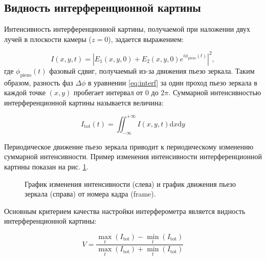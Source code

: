 \subsection{Видность интерференционной картины}\label{sec:ch2/sec1/subsec3}

Интенсивность интерференционной картины, получаемой при наложении двух лучей в плоскости камеры ($z=0$), задается выражением:

\begin{equation}
    I(x,y,t)=|E_1(x,y,0)+E_2(x,y,0)e^{i\phi_{\mathrm{piezo}}(t)}|^2,
\label{eq:I_def}
\end{equation}
где $\phi_{\mathrm{piezo}}(t)$ фазовый сдвиг, получаемый из-за движения пьезо зеркала. Таким образом, разность фаз $\Delta \phi$ в уравнении \eqref{eq:interf} за один проход пьезо зеркала в каждой точке $(x, y)$ пробегает интервал от $0$ до $2\pi$. Суммарной интенсивностью интерференционной картины называется величина: 

\begin{equation}
    I_{\mathrm{tot}}(t) = \iint_{-\infty}^{+\infty} I(x, y, t) {\mathrm{d}}x{\mathrm{d}}y
\end{equation}

Периодическое движение пьезо зеркала приводит к периодическому изменению суммарной интенсивности. Пример изменения интенсивности интерференционной картины показан на рис. \ref{fig:intens_plot}.

\begin{figure}[ht]
\caption{График изменения интенсивности (слева) и график движения пьезо зеркала (справа) от номера кадра (frame).}
\label{fig:intens_plot}
\end{figure}

Основным критерием качества настройки интерферометра является видность интерференционной картины: 

\begin{equation}
    V = \frac{            
        \max_{t}(I_{\mathrm{tot}}) - \min_t(I_{\mathrm{tot}})}
        {\max_{t}(I_{\mathrm{tot}}) + \min_t(I_{\mathrm{tot}})}
    \label{eq:visib}
\end{equation}

